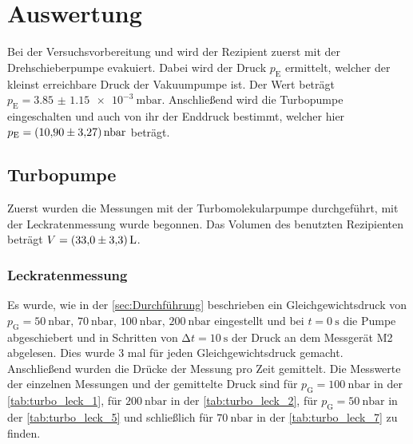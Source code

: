 \section{Auswertung}
\label{sec:Auswertung}

\noindent Bei der Versuchsvorbereitung und wird der Rezipient zuerst mit der Drehschieberpumpe evakuiert. Dabei wird der Druck $p_\text{E}$ ermittelt, welcher der kleinst erreichbare Druck 
der Vakuumpumpe ist. Der Wert beträgt $p_\text{E} = \SI{3.85(115)e-3}{\milli\bar}$. Anschließend wird die Turbopumpe eingeschalten und auch von ihr der Enddruck bestimmt, welcher hier 
$p_\text{E} = \SI{10.9 \pm 3.27}{\nano\bar}$ beträgt. 

\subsection{Turbopumpe}

  \noindent Zuerst wurden die Messungen mit der Turbomolekularpumpe durchgeführt, mit der Leckratenmessung wurde begonnen. Das Volumen des benutzten Rezipienten beträgt $V = \SI{33 \pm 3.3}{L}$. 
  
  \subsubsection{Leckratenmessung}

    \noindent Es wurde, wie in der \autoref{sec:Durchführung} beschrieben ein Gleichgewichtsdruck von $p_\text{G} = \SI{50}{\nano\bar}, \, \SI{70}{\nano\bar}, \,  \SI{100}{\nano\bar},\, \SI{200}{\nano\bar}$ eingestellt 
    und bei $t = \SI{0}{\second}$ die Pumpe abgeschiebert und in Schritten von $\increment t = \SI{10}{\second}$ der Druck an dem Messgerät M2 abgelesen. Dies wurde 3 mal für jeden 
    Gleichgewichtsdruck gemacht. Anschließend wurden die Drücke der Messung pro Zeit gemittelt. Die Messwerte der einzelnen Messungen und der gemittelte Druck sind für $p_\text{G} = \SI{100}{\nano\bar}$ in der \autoref{tab:turbo_leck_1}, für 
    $\SI{200}{\nano\bar}$ in der \autoref{tab:turbo_leck_2}, für $p_\text{G} = \SI{50}{\nano\bar}$ in der \autoref{tab:turbo_leck_5} und schließlich für $\SI{70}{\nano\bar}$ in der \autoref{tab:turbo_leck_7} zu finden. 

